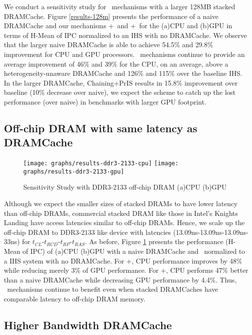 We conduct a sensitivity study for \cachename\ mechanisms with a larger 128MB stacked DRAMCache. Figure \ref{results-128m} presents the performance of a naive DRAMCache and our mechanisms \bypassname+\prioname\ and \chaining+\prioname\ for the (a)CPU and (b)GPU in terms of H-Mean of IPC normalized to an IHS with no DRAMCache. We observe that the larger naive DRAMCache is able to achieve 54.5\% and 29.8\% improvement for CPU and GPU processors. \cachename\ mechanisms continue to provide an average improvement of 46\% and 39\% for the CPU, on an average, above a heterogeneity-unaware DRAMCache and 126\% and 115\% over the baseline IHS. 
In the larger DRAMCache, Chaining+PrIS results in 15.8\% improvement over baseline (10\% decrease over naive), we
expect the scheme to catch up the lost performance (over naive) in benchmarks with larger GPU footprint.


\subsection{Off-chip DRAM with same latency as DRAMCache}

\begin{figure}[!htb]
	\centering
	\texttt{[image: graphs/results-ddr3-2133-cpu]}
	\texttt{[image: graphs/results-ddr3-2133-gpu]}
	\caption{Sensitivity Study with DDR3-2133 off-chip DRAM (a)CPU (b)GPU}
	\label{results-2xbw}
\end{figure}

Although we expect the smaller sizes of stacked DRAMs to have lower latency than off-chip DRAMs, commercial stacked DRAM like those in Intel's Knights Landing \cite{xeonphi} have access latencies similar to off-chip DRAMs. Hence, we scale up the off-chip DRAM to DDR3-2133 like device with latencies (13.09ns-13.09ns-13.09ns-33ns) for $t_{CL}$-$t_{RCD}$-$t_{RP}$-$t_{RAS}$. As before, Figure \ref{results-2xbw} presents the performance (H-Mean of IPC) of (a)CPU (b)GPU with a naive DRAMCache and \cachename\ normalized to a IHS system with no DRAMCache. For \prioname+\bypassname, CPU performance improves by 48\% while reducing merely 3\% of GPU performance. For \prioname+\chaining, CPU performs 47\% better than a naive DRAMCache while decreasing GPU performance by 4.4\%. Thus, \cachename\ mechanisms continue to benefit even when stacked DRAMCaches have comparable latency to off-chip DRAM memory.

\subsection{Higher Bandwidth DRAMCache}

